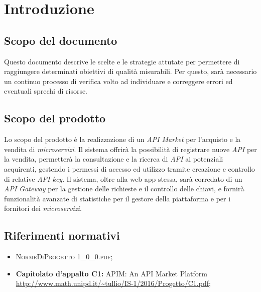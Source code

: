 \newpage
\section{Introduzione}

\subsection{Scopo del documento}
Questo documento descrive le scelte e le strategie attutate per permettere di raggiungere determinati obiettivi di qualità misurabili. Per questo, sarà necessario un continuo processo di verifica volto ad individuare e correggere errori ed eventuali sprechi di risorse.

\subsection{Scopo del prodotto}
Lo scopo del prodotto è la realizzazione di un \textit{API Market} per l'acquisto e la vendita di \textit{microservizi}. Il sistema offrirà la possibilità di registrare nuove \textit{API} per la vendita, permetterà la consultazione e la ricerca di \textit{API} ai potenziali acquirenti, gestendo i permessi di accesso ed utilizzo tramite creazione e controllo di relative \textit{API key}. Il sistema, oltre alla web app stessa, sarà corredato di un \textit{API Gateway} per la gestione delle richieste e il controllo delle chiavi, e fornirà funzionalità avanzate di statistiche per il gestore della piattaforma e per i fornitori dei \textit{microservizi}.

\subsection{Riferimenti normativi}
\begin{itemize}
\item \textsc{NormeDiProgetto 1\_0\_0.pdf};
\item \textbf{Capitolato d’appalto C1:} APIM: An API Market Platform\\ \url{http://www.math.unipd.it/~tullio/IS-1/2016/Progetto/C1.pdf};
\end{itemize}

